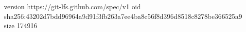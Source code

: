 version https://git-lfs.github.com/spec/v1
oid sha256:43202d7bdd96964a9d91f3fb263a7ee4ba8c56f8d396d8518c8278be366525a9
size 174916

